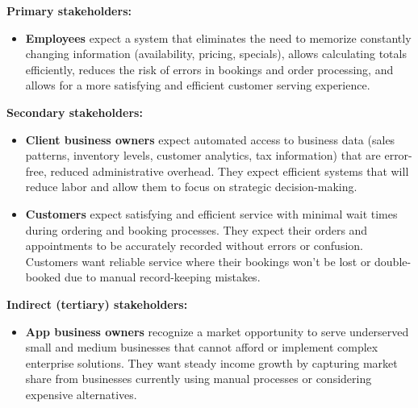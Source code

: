 \documentclass[]{VUMIFTemplateClass}
\newcommand{\warningcomment}[1]{%
    \begin{tcolorbox}[colback=yellow!90, colframe=red, arc=0pt, outer arc=0pt, boxrule=2pt, left=5pt, right=5pt, top=5pt, bottom=5pt]
        \Large\textbf{\textcolor{red}{FIX THIS: }} \normalsize #1
    \end{tcolorbox}
}
\begin{document}
\textbf{Primary stakeholders:}
\begin{itemize}
    \item \textbf{Employees} expect a system that eliminates the need to
    memorize constantly changing information (availability, pricing, specials),
    allows calculating totals efficiently, reduces the risk of errors in
    bookings and order processing, and allows for a more satisfying and
    efficient customer serving experience.

\end{itemize}

\textbf{Secondary stakeholders:}
\begin{itemize}
    \item \textbf{Client business owners} expect automated access to business
    data (sales patterns, inventory levels, customer analytics, tax information) that are
    error-free, reduced administrative overhead. They expect efficient systems
    that will reduce labor and allow them to focus on strategic decision-making.

    \item \textbf{Customers} expect satisfying and efficient service with minimal wait
    times during ordering and booking processes. They expect their orders and
    appointments to be accurately recorded without errors or confusion.
    Customers want reliable service where their bookings won't be lost
    or double-booked due to manual record-keeping mistakes.
\end{itemize}

\textbf{Indirect (tertiary) stakeholders:}
\begin{itemize}
    \item \textbf{App business owners} recognize a market opportunity to serve
    underserved small and medium businesses that cannot afford or implement
    complex enterprise solutions. They want steady income growth by capturing
    market share from businesses currently using manual processes or considering
    expensive alternatives.
\end{itemize}
\end{document}
